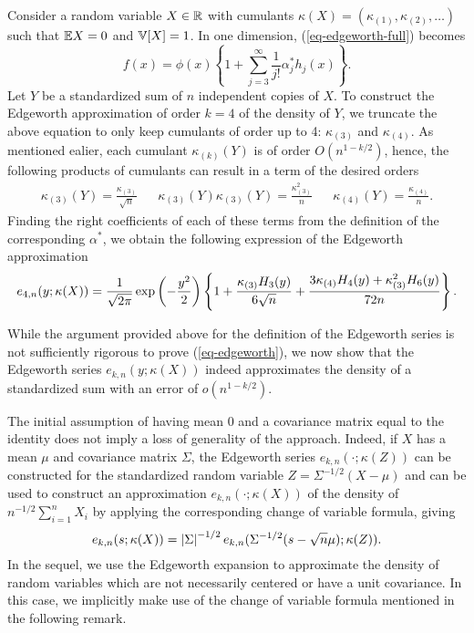 \begin{example} \label{ex-edgeworth-1d}
    Consider a random variable $X \in \mathbb{R}$ with cumulants $\kappa(X) = (\kappa_{(1)}, \kappa_{(2)}, \ldots)$ such that $\mathbb{E}{X} = 0$ and $\mathbb{V}[X] = 1$. In one dimension, (\ref{eq-edgeworth-full}) becomes
    \begin{equation*}
        f(x) = \phi(x) \left\{
            1 + \sum_{j=3}^\infty  \frac{1}{j!}\alpha^*_j h_j(x)
        \right\}.
    \end{equation*}
    Let $Y$ be a standardized sum of $n$ independent copies of $X$. To construct the Edgeworth approximation of order $k = 4$ of the density of $Y$, we truncate the above equation to only keep cumulants of order up to 4: $\kappa_{(3)}$ and $\kappa_{(4)}$. As mentioned ealier, each cumulant $\kappa_{(k)}(Y)$ is of order $O(n^{1-k/2})$, hence, the following products of cumulants can result in a term of the desired orders
    \begin{align*}
        \kappa_{(3)}(Y) = \frac{\kappa_{(3)}}{\sqrt{n}} && \kappa_{(3)}(Y)\kappa_{(3)}(Y) = \frac{\kappa_{(3)}^2}{n} && \kappa_{(4)}(Y) = \frac{\kappa_{(4)}}{n}.
    \end{align*}
    Finding the right coefficients of each of these terms from the definition of the corresponding $\alpha^*$, we obtain the following expression of the Edgeworth approximation
    \begin{equation} \label{eq-edgeworth-1d-4}
        e_{4, n}(y; \kappa(X)) = \frac{1}{\sqrt{2\pi}}\exp\left(-\frac{y^2}{2}\right)\left\{1 + \frac{\kappa_{(3)} H_3(y)}{6\sqrt{n}} + \frac{3\kappa_{(4)} H_4(y) + \kappa_{(3)}^2 H_6(y)}{72 n}\right\}.
    \end{equation}
\end{example}

While the argument provided above for the definition of the Edgeworth series is not sufficiently rigorous to prove (\ref{eq-edgeworth}), we now show that the Edgeworth series $e_{k, n}(y; \kappa(X))$ indeed approximates the density of a standardized sum with an error of $o(n^{1-k/2})$.

\begin{remark} \label{rem-centering}
    The initial assumption of having mean 0 and a covariance matrix equal to the identity does not imply a loss of generality of the approach. Indeed, if $X$ has a mean $\mu$ and covariance matrix $\Sigma$, the Edgeworth series $e_{k, n}(\cdot; \kappa(Z))$ can be constructed for the standardized random variable $Z = \Sigma^{-1/2}(X - \mu)$ and can be used to construct an approximation $e_{k, n}(\cdot; \kappa(X))$ of the density of $n^{-1/2} \sum_{i=1}^n X_i$ by applying the corresponding change of variable formula, giving
    \begin{equation*}
        e_{k, n}(s; \kappa(X)) = \left|\Sigma\right|^{-1/2} e_{k, n}(\Sigma^{-1/2}(s - \sqrt{n}\mu); \kappa(Z)).
    \end{equation*}
    In the sequel, we use the Edgeworth expansion to approximate the density of random variables which are not necessarily centered or have a unit covariance. In this case, we implicitly make use of the change of variable formula mentioned in the following remark. 
\end{remark}



